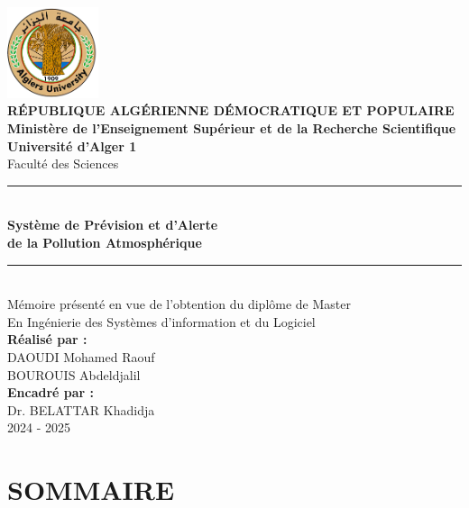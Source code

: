 \documentclass[12pt,a4paper]{report}
\begin{document}
\newpage
\begin{titlepage}
\begin{center}
    \includegraphics[width=0.2\textwidth]{logo_universite.png}\\[1cm]
    
    {\Large \textbf{RÉPUBLIQUE ALGÉRIENNE DÉMOCRATIQUE ET POPULAIRE}}\\[0.5cm]
    {\large \textbf{Ministère de l'Enseignement Supérieur et de la Recherche Scientifique}}\\[0.5cm]
    {\large \textbf{Université d'Alger 1}}\\
    {\large Faculté des Sciences}\\[0.5cm]

    \rule{\linewidth}{0.5mm} \\[0.4cm]
    {\Huge \textbf{Système de Prévision et d’Alerte\\ de la Pollution Atmosphérique}}\\[0.4cm]
    \rule{\linewidth}{0.5mm} \\[1cm]
    
    {\large Mémoire présenté en vue de l’obtention du diplôme de Master}\\
    {\large En Ingénierie des Systèmes d’information et du Logiciel}\\[1cm]

    \textbf{Réalisé par :}\\
    {\large DAOUDI Mohamed Raouf\\
    BOUROUIS Abdeldjalil}\\[1cm]

    \textbf{Encadré par :}\\
    {\large Dr. BELATTAR Khadidja}\\[1cm]
    
    {\large 2024 - 2025}
\end{center}
\end{titlepage}

\newpage
{}
{}
\chapter*{SOMMAIRE}
\tableofcontents
\end{document}
